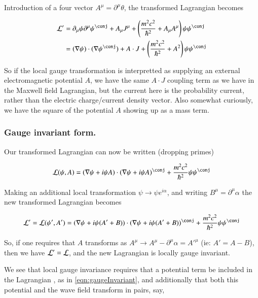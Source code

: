 \documentclass{article}
\begin{document}
Introduction of a four vector $A^\mu = \partial^\mu \theta$, the transformed Lagrangian becomes

\begin{align*}
\LL' 
&=
\partial_\mu \psi \partial^\mu \psi^\conj 
+ A_\mu J^\mu
+ \left( \frac{m^2 c^2}{\hbar^2} + A_\mu A^\mu \right) \psi {\psi}^\conj \\
&=
(\grad \psi) \cdot (\grad \psi^\conj) + A \cdot J 
+ \left( \frac{m^2 c^2}{\hbar^2} + A^2 \right) \psi {\psi}^\conj \\
\end{align*}

So if the local gauge transformation is interpretted as supplying an external electromagnetic potential $A$, we have the same $A \cdot J$ coupling term 
as we have in the Maxwell field Lagrangian, but the current here is the probability current, rather than the electric charge/current density vector.  Also
somewhat curiously, we have the square of the potential $A$ showing up as a mass term.

\subsubsection{ Gauge invariant form. }

Our transformed Lagrangian can now be written (dropping primes)

\begin{align}\label{eqn:gaugeInvariant}
\LL(\psi, A)
&=
(\grad \psi + i \psi A) \cdot (\grad \psi + i \psi A)^\conj
+ \frac{m^2 c^2}{\hbar^2} \psi {\psi}^\conj \\
\end{align}

Making an additional local transformation $\psi \rightarrow \psi e^{i\alpha}$, and writing $B^\mu = \partial^\mu \alpha$ the new transformed Lagrangian becomes

\begin{align*}
\LL' = \LL(\psi', A')
&=
(\grad \psi + i \psi (A'+B)) \cdot (\grad \psi + i \psi (A'+B))^\conj
+ \frac{m^2 c^2}{\hbar^2} \psi {\psi}^\conj \\
\end{align*}

So, if one requires that $A$ transforms as $A^\mu \rightarrow A^\mu - \partial^\mu \alpha = {A'}^\mu$ (ie: $A' = A - B$), then we have $\mathcal{L}' = \mathcal{L}$, and 
the new Lagrangian is locally gauge invariant.

We see that local gauge invariance requires that a potential term be included in the Lagrangian
, as in \ref{eqn:gaugeInvariant}, and additionally that both this potential and the wave field transform in pairs, say,
\end{document}
